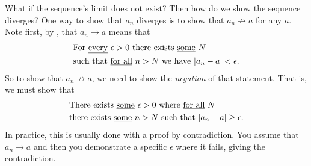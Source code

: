 \begin{outline}
  What if the sequence's limit does not exist? Then how do we show
  the sequence diverges? One way to show that $a_n$ diverges is to
  show that $a_n \not\to a$ for any $a$. Note first, by
  , that $a_n \to a$ means that
  \begin{align*}
    & \text{For \underline{every} $\epsilon > 0$ there exists
    \underline{some} $N$} \\
    & \text{such that \underline{for all} $n > N$ we have $| a_n -
    a | < \epsilon$}.
  \end{align*}
  So to show that $a_n \not\to a$, we need to show the
  \textit{negation} of that statement. That is, we must show that
  \begin{align*}
    & \text{There exists \underline{some} $\epsilon > 0$ where
    \underline{for all} $N$} \\
    & \text{there exists \underline{some} $n > N$ such that $| a_n -
    a | \geq \epsilon$}.
  \end{align*}
  In practice, this is usually done with a proof by contradiction.
  You assume that $a_n \to a$ and then you demonstrate a specific
  $\epsilon$ where it fails, giving the contradiction.
\end{outline}


